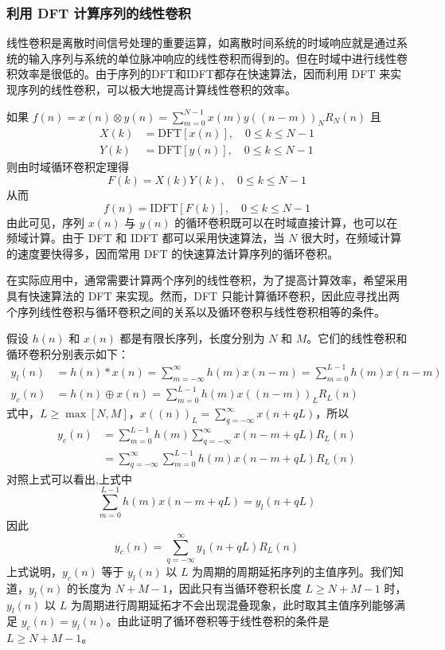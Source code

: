 \documentclass[12pt,AutoFakeBold]{article}
\begin{document}
\subsubsection{利用 DFT 计算序列的线性卷积}

线性卷积是离散时间信号处理的重要运算，如离散时间系统的时域响应就是通过系统的输入序列与系统的单位脉冲响应的线性卷积而得到的。但在时域中进行线性卷积效率是很低的。由于序列的DFT和IDFT都存在快速算法，因而利用 DFT 来实现序列的线性卷积，可以极大地提高计算线性卷积的效率。

如果 $f(n)=x(n)\otimes y(n)=\displaystyle\sum_{m=0}^{N-1}x(m)y((n-m))_NR_N(n)$ 且
%
\begin{align*}
X(k)&=\mathrm{DFT}[x(n)],\quad 0\le k\le N-1 \\
Y(k)&=\mathrm{DFT}[y(n)],\quad 0\le k\le N-1
\end{align*}
%
则由时域循环卷积定理得
\begin{equation*}
F(k)=X(k)Y(k),\quad 0\le k\le N-1
\end{equation*}
%
从而
\begin{equation*}
f(n)=\mathrm{IDFT}[F(k)],\quad 0\le k\le N-1
\end{equation*}
%
由此可见，序列 $x(n)$ 与 $y(n)$ 的循环卷积既可以在时域直接计算，也可以在频域计算。由于 DFT 和 IDFT 都可以采用快速算法，当 $N$ 很大时，在频域计算的速度要快得多，因而常用 DFT 的快速算法计算序列的循环卷积。

在实际应用中，通常需要计算两个序列的线性卷积，为了提高计算效率，希望采用具有快速算法的 DFT 来实现。然而，DFT 只能计算循环卷积，因此应寻找出两个序列线性卷积与循环卷积之间的关系以及循环卷积与线性卷积相等的条件。

假设 $h(n)$ 和 $x(n)$ 都是有限长序列，长度分别为 $N$ 和 $M$。它们的线性卷积和循环卷积分别表示如下：
%
\begin{align*}
y_l(n) &= h(n) * x(n)=\sum_{m=-\infty}^\infty h(m)x(n-m)=\sum_{m=0}^{L-1}h(m)x(n-m) \\
y_c(n) &= h(n) \oplus x(n)=\sum_{m=0}^{L-1}h(m)x((n-m))_LR_L(n)
\end{align*}
%
式中，$L\ge\max{[N,M]}$，$x((n))_L=\displaystyle\sum_{q=-\infty}^\infty x(n+qL)$，所以
%
\begin{align*}
y_c(n)&=\sum_{m=0}^{L-1}h(m)\sum_{q=-\infty}^\infty x(n-m+qL)R_L(n) \\
&=\sum_{q=-\infty}^\infty\sum_{m=0}^{L-1}h(m)x(n-m+qL)R_L(n)
\end{align*}
%
对照上式可以看出,上式中
%
\begin{equation*}
\sum_{m=0}^{L-1} h(m)x(n-m+qL)=y_l(n+qL)
\end{equation*}
%
因此
\begin{equation*}
y_c(n)=\sum_{q=-\infty}^\infty y_1(n+qL)R_L(n)
\end{equation*}
%
上式说明，$y_c(n)$ 等于 $y_l(n)$ 以 $L$ 为周期的周期延拓序列的主值序列。我们知道，$y_l(n)$ 的长度为 $N+M-1$，因此只有当循环卷积长度 $L\ge N+M-1$ 时，$y_l(n)$ 以 $L$ 为周期进行周期延拓才不会出现混叠现象，此时取其主值序列能够满足 $y_c(n)=y_l(n)$。由此证明了循环卷积等于线性卷积的条件是 $L\ge N+M-1$。
\end{document}
